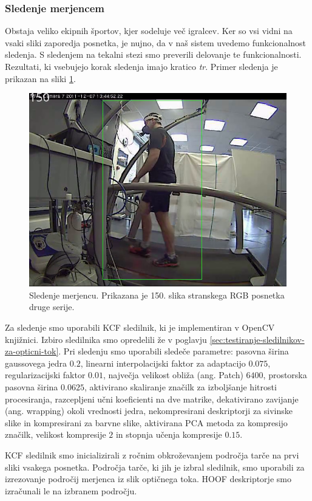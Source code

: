 \subsubsection{Sledenje merjencem}\label{sec:tracking}
Obstaja veliko ekipnih športov, kjer sodeluje več igralcev. Ker so vsi vidni na vsaki sliki zaporedja posnetka, je nujno, da v naš sistem uvedemo funkcionalnost sledenja. S sledenjem na tekalni stezi smo preverili delovanje te funkcionalnosti. Rezultati, ki vsebujejo korak sledenja imajo kratico \textit{tr}. Primer sledenja je prikazan na sliki \ref{fig:sledenje}.

\begin{figure}[htb]
	\centering
	\includegraphics[width=0.6\columnwidth]{./Slike/normal-sv-test-kcf2.png}
	\caption[Sledenje merjencu]{Sledenje merjencu. Prikazana je 150. slika stranskega RGB posnetka druge serije.}
	\label{fig:sledenje}
\end{figure} 

Za sledenje smo uporabili KCF sledilnik, ki je implementiran v OpenCV knjižnici. Izbiro sledilnika smo opredelili že v poglavju \ref{sec:testiranje-sledilnikov-za-opticni-tok}. Pri sledenju smo uporabili sledeče parametre: pasovna širina gaussovega jedra $0.2$, linearni interpolacijski faktor za adaptacijo $0.075$, regularizacijski faktor $0.01$, največja velikost obliža (ang. Patch) $6400$, prostorska pasovna širina $0.0625$, aktivirano skaliranje značilk za izboljšanje hitrosti procesiranja, razcepljeni učni koeficienti na dve matrike, dekativirano zavijanje (ang. wrapping) okoli vrednosti jedra, nekompresirani deskriptorji za sivinske slike in kompresirani za barvne slike, aktivirana PCA metoda za kompresijo značilk, velikost kompresije $2$ in  stopnja učenja kompresije $0.15$.

KCF sledilnik smo inicializirali z ročnim obkroževanjem področja tarče na prvi sliki vsakega posnetka. Področja tarče, ki jih je izbral sledilnik, smo uporabili za izrezovanje področij merjenca iz slik optičnega toka. HOOF deskriptorje smo izračunali le na izbranem področju. 



